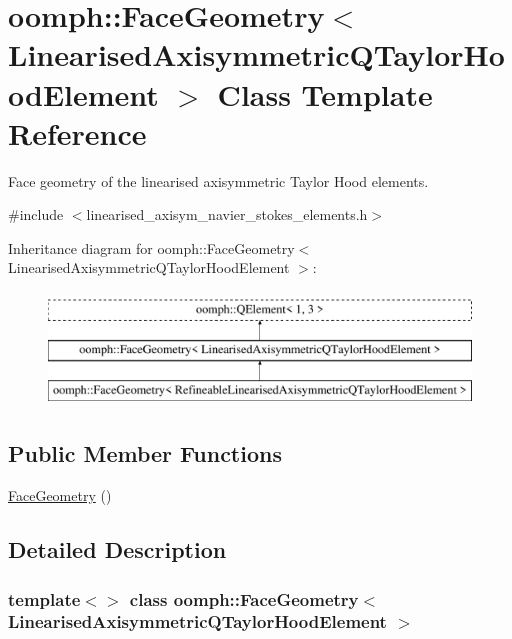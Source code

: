\hypertarget{classoomph_1_1FaceGeometry_3_01LinearisedAxisymmetricQTaylorHoodElement_01_4}{}\section{oomph\+:\+:Face\+Geometry$<$ Linearised\+Axisymmetric\+Q\+Taylor\+Hood\+Element $>$ Class Template Reference}
\label{classoomph_1_1FaceGeometry_3_01LinearisedAxisymmetricQTaylorHoodElement_01_4}


Face geometry of the linearised axisymmetric Taylor Hood elements.  




{\ttfamily \#include $<$linearised\+\_\+axisym\+\_\+navier\+\_\+stokes\+\_\+elements.\+h$>$}

Inheritance diagram for oomph\+:\+:Face\+Geometry$<$ Linearised\+Axisymmetric\+Q\+Taylor\+Hood\+Element $>$\+:\begin{figure}[H]
\begin{center}
\leavevmode
\includegraphics[height=3.000000cm]{classoomph_1_1FaceGeometry_3_01LinearisedAxisymmetricQTaylorHoodElement_01_4}
\end{center}
\end{figure}
\subsection*{Public Member Functions}
\begin{DoxyCompactItemize}
\item 
\hyperlink{classoomph_1_1FaceGeometry_3_01LinearisedAxisymmetricQTaylorHoodElement_01_4_aba4736892c14de22e160acfe9a722551}{Face\+Geometry} ()
\end{DoxyCompactItemize}


\subsection{Detailed Description}
\subsubsection*{template$<$$>$\newline
class oomph\+::\+Face\+Geometry$<$ Linearised\+Axisymmetric\+Q\+Taylor\+Hood\+Element $>$}

